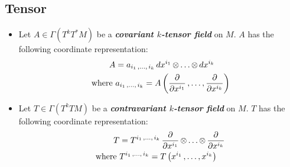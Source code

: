 \documentclass[11pt]{article}
\begin{document}
\subsection{Tensor}
\begin{itemize}
\item Let $A \in \Gamma(T^k T^{*}M)$ be a \emph{\textbf{covariant $k$-tensor field}} on $M$. $A$ has the following coordinate representation:
\begin{align}
A &=a_{i_1 \,{,}\ldots{,}\, i_k}\, dx^{i_1} \,{\otimes}\ldots{\otimes}\, dx^{i_k}  \label{eqn: covariant_k_tensor_coordinate}\\
\text{where }& a_{i_1 \,{,}\ldots{,}\, i_k} = A\left(\frac{\partial }{ \partial x^{i_1}} \,{,}\ldots{,}\, \frac{\partial }{ \partial x^{i_k}}\right) \label{eqn: covariant_k_tensor_coordinate_component}
\end{align}

\item Let $T \in \Gamma(T^k TM)$  be a \emph{\textbf{contravariant $k$-tensor field}} on $M$. $T$ has the following coordinate representation:
\begin{align}
T &=T^{i_1 \,{,}\ldots{,}\, i_k}\, \frac{\partial }{ \partial x^{i_1}} \,{\otimes}\ldots{\otimes}\, \frac{\partial }{ \partial x^{i_k}}  \label{eqn: contravariant_k_tensor_coordinate}\\
\text{where }& T^{i_1 \,{,}\ldots{,}\, i_k} = T\left(x^{i_1} \,{,}\ldots{,}\, x^{i_k}\right) \label{eqn: contravariant_k_tensor_coordinate_component}
\end{align}
\end{itemize}
\end{document}
